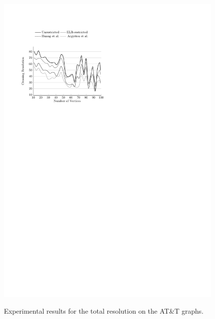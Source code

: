 \documentclass{comjnl}
\begin{document}
\begin{figure}[t!]
{	\includegraphics[scale=0.99,page=8]{figures/north}}
	\caption{Experimental results for the total resolution on the AT\&T graphs.}
	\label{fig:northTotal}
\end{figure}
\end{document}
